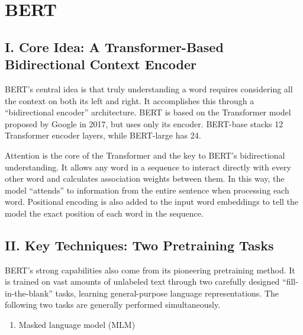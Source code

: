 \setcounter{section}{4}

\hypertarget{bert}{%
\section{BERT}\label{bert}}

\hypertarget{i.-core-idea-a-transformer-based-bidirectional-context-encoder}{%
\subsection{I. Core Idea: A Transformer-Based Bidirectional Context Encoder}\label{i.-core-idea-a-transformer-based-bidirectional-context-encoder}}

BERT's central idea is that truly understanding a word requires considering all the context on both its left and right. It accomplishes this through a ``bidirectional encoder'' architecture. BERT is based on the Transformer model proposed by Google in 2017, but uses only its encoder. BERT-base stacks 12 Transformer encoder layers, while BERT-large has 24.

Attention is the core of the Transformer and the key to BERT's bidirectional understanding. It allows any word in a sequence to interact directly with every other word and calculates association weights between them. In this way, the model ``attends'' to information from the entire sentence when processing each word. Positional encoding is also added to the input word embeddings to tell the model the exact position of each word in the sequence.

\hypertarget{ii.-key-techniques-two-pretraining-tasks}{%
\subsection{II. Key Techniques: Two Pretraining Tasks}\label{ii.-key-techniques-two-pretraining-tasks}}

BERT's strong capabilities also come from its pioneering pretraining method. It is trained on vast amounts of unlabeled text through two carefully designed ``fill-in-the-blank'' tasks, learning general-purpose language representations. The following two tasks are generally performed simultaneously.

\begin{enumerate}
\def\labelenumi{\arabic{enumi}.}
\tightlist
\item
  Masked language model (MLM)
\end{enumerate}

